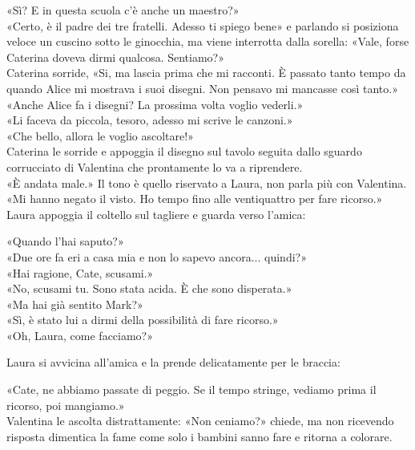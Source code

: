 \documentclass[10pt,oneside]{extbook}
\begin{document}
«Sì? E in questa scuola c’\`e anche un maestro?»\\
«Certo, \`e il padre dei tre fratelli. Adesso ti spiego bene» e parlando si posiziona veloce un cuscino sotto le ginocchia, ma viene interrotta dalla sorella:
«Vale, forse Caterina doveva dirmi qualcosa. Sentiamo?»\\
Caterina sorride,
«Si, ma lascia prima che mi racconti. \`E passato tanto tempo da quando Alice  mi mostrava i suoi disegni. Non pensavo mi mancasse cos\`i tanto.»
\\
«Anche Alice fa i disegni? La prossima volta voglio vederli.»\\

«Li faceva da piccola, tesoro, adesso mi scrive le canzoni.»
\\
«Che bello, allora le voglio ascoltare!»\\

Caterina le sorride e appoggia il disegno sul tavolo seguita dallo sguardo corrucciato di Valentina che prontamente lo va a riprendere.\\

«\`E andata male.» Il tono \`e quello riservato a Laura, non parla pi\`u con Valentina. «Mi hanno negato il visto. Ho tempo fino alle ventiquattro per fare ricorso.»\\

Laura appoggia il coltello sul tagliere e guarda verso l’amica:

«Quando l’hai saputo?»\\
«Due ore fa eri a casa mia e non lo sapevo ancora... quindi?»\\
«Hai ragione, Cate, scusami.»\\
«No, scusami tu. Sono stata acida. \`E che sono disperata.»\\
«Ma hai gi\`a sentito Mark?»\\
«Sì, \`e stato lui a dirmi della possibilità di fare ricorso.»\\
«Oh, Laura, come facciamo?»

Laura si avvicina all'amica e la prende delicatamente per le braccia:

«Cate, ne abbiamo passate di peggio. Se il tempo stringe, vediamo prima il ricorso, poi mangiamo.»\\

Valentina le ascolta distrattamente:
«Non ceniamo?» chiede, ma non ricevendo risposta dimentica la fame come solo i bambini sanno fare e ritorna a colorare.\\
\end{document}
